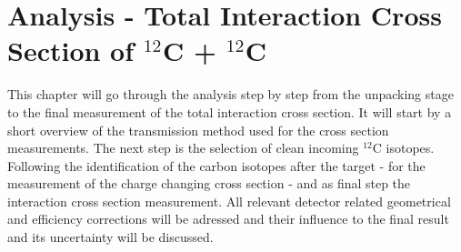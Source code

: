 \section{Analysis - Total Interaction Cross Section of  $^{12}$C + $^{12}$C}
This chapter will go through the  analysis step by step from the unpacking stage to the final measurement of the total interaction cross section. It will start by a short overview of the transmission method used for the cross section measurements. The next step is  the selection of clean incoming $^{12}$C isotopes. Following the identification of the carbon isotopes after the target - for the measurement of the charge changing cross section - and as final step the interaction cross section measurement. \newline
All relevant detector related geometrical and efficiency corrections will be adressed and their influence to the final result and its uncertainty will be discussed.
